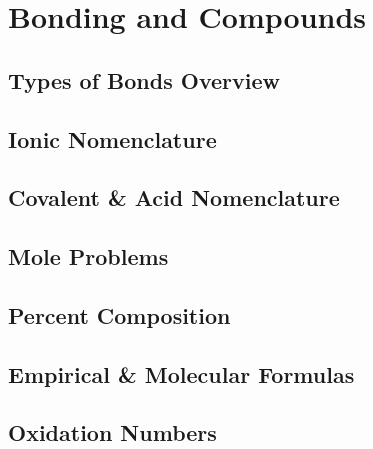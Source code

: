 \documentclass[../hchem.tex]{subfiles}
\begin{document}
\chapter{Bonding and Compounds}
\section{Types of Bonds Overview}
\section{Ionic Nomenclature}
\section{Covalent \& Acid Nomenclature}
\section{Mole Problems}
\section{Percent Composition}
\section{Empirical \& Molecular Formulas}
\section{Oxidation Numbers}
\end{document}

